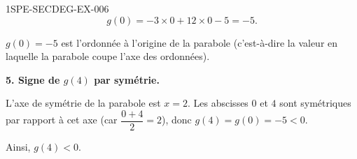 \begin{corrige}{1SPE-SECDEG-EX-006}
\[g(0) = -3 \times 0 + 12 \times 0 - 5 = -5.\]


$g(0) = -5$ est l'ordonnée à l'origine de la parabole (c'est-à-dire la valeur en laquelle la parabole coupe l'axe des ordonnées).

\medskip
\textbf{5. Signe de $g(4)$ par symétrie.}


L'axe de symétrie de la parabole est $x = 2$. Les abscisses $0$ et $4$ sont symétriques par rapport à cet axe (car $\dfrac{0+4}{2} = 2$), donc $g(4) = g(0) = -5 < 0$.

Ainsi, $g(4) < 0$.

\end{corrige}
